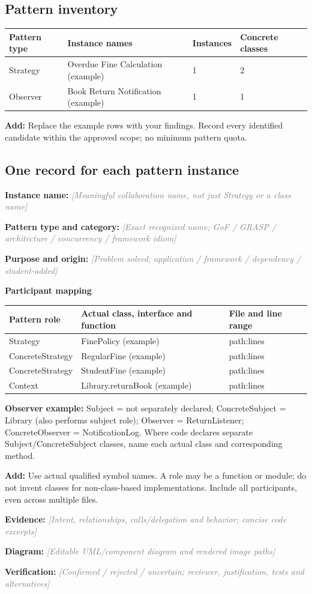 \documentclass[11pt,a4paper]{article}
\newcommand{\entry}[2]{\textbf{#1:} \textcolor{gray}{\textit{[#2]}}\par}
\newcommand{\help}[1]{\textbf{Add:} #1\par}
\begin{document}
\subsection{Pattern inventory}
\begin{tabularx}{\linewidth}{@{}lXll@{}}\toprule
Pattern type & Instance names & Instances & Concrete classes\\\midrule
Strategy & Overdue Fine Calculation (example) & 1 & 2\\
Observer & Book Return Notification (example) & 1 & 1\\\bottomrule
\end{tabularx}
\help{Replace the example rows with your findings. Record every identified candidate within the approved scope; no minimum pattern quota.}
\subsection{One record for each pattern instance}
\entry{Instance name}{Meaningful collaboration name, not just Strategy or a class name}
\entry{Pattern type and category}{Exact recognized name; GoF / GRASP / architecture / concurrency / framework idiom}
\entry{Purpose and origin}{Problem solved; application / framework / dependency / student-added}

\textbf{Participant mapping}\par
\begin{tabularx}{\linewidth}{@{}lXX@{}}\toprule
Pattern role & Actual class, interface and function & File and line range\\\midrule
Strategy & FinePolicy (example) & path:lines\\
ConcreteStrategy & RegularFine (example) & path:lines\\
ConcreteStrategy & StudentFine (example) & path:lines\\
Context & Library.returnBook (example) & path:lines\\\bottomrule
\end{tabularx}
\textbf{Observer example:} Subject = not separately declared; ConcreteSubject = Library (also performs subject role); Observer = ReturnListener; ConcreteObserver = NotificationLog. Where code declares separate Subject/ConcreteSubject classes, name each actual class and corresponding method.\par
\help{Use actual qualified symbol names. A role may be a function or module; do not invent classes for non-class-based implementations. Include all participants, even across multiple files.}
\entry{Evidence}{Intent, relationships, calls/delegation and behavior; concise code excerpts}
\entry{Diagram}{Editable UML/component diagram and rendered image paths}
\entry{Verification}{Confirmed / rejected / uncertain; reviewer, justification, tests and alternatives}
\end{document}
